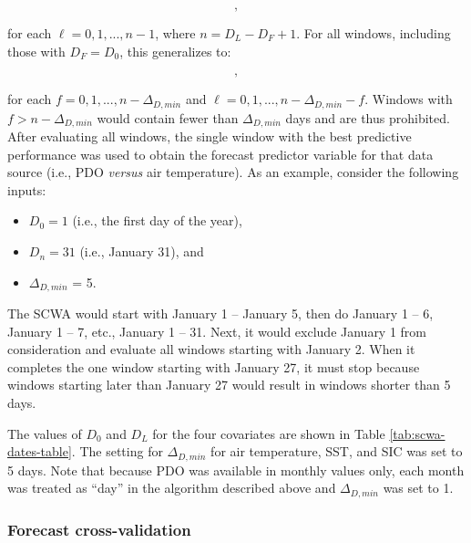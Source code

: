 \documentclass[12pt,]{book}
\providecommand{\tightlist}{%
  \setlength{\itemsep}{0pt}\setlength{\parskip}{0pt}}
\theoremstyle{definition}
\theoremstyle{definition}
\theoremstyle{definition}
\theoremstyle{remark}
\begin{document}
\begin{equation}
  [D_0, D_0 + \Delta_{D,min} - 1 + \ell],
\label{eq:scwa-1}
\end{equation}

\noindent
for each \(\ell = 0, 1, ..., n - 1\), where \(n = D_L - D_F + 1\). For
all windows, including those with \(D_F = D_0\), this generalizes to:

\begin{equation}
  [D_0 + f, D_0 + f + \Delta_{D,min} - 1 + \ell],
\label{eq:scwa-2}
\end{equation}

\noindent
for each \(f = 0, 1, ..., n - \Delta_{D,min}\) and
\(\ell = 0, 1, ..., n - \Delta_{D,min} - f\). Windows with
\(f > n - \Delta_{D,min}\) would contain fewer than \(\Delta_{D,min}\)
days and are thus prohibited. After evaluating all windows, the single
window with the best predictive performance was used to obtain the
forecast predictor variable for that data source (i.e., PDO
\emph{versus} air temperature). As an example, consider the following
inputs:

\begin{itemize}
\tightlist
\item
  \(D_0 = 1\) (i.e., the first day of the year),
\item
  \(D_n = 31\) (i.e., January 31), and
\item
  \(\Delta_{D,min}\) = 5.
\end{itemize}

The SCWA would start with January 1 -- January 5, then do January 1 --
6, January 1 -- 7, etc., January 1 -- 31. Next, it would exclude January
1 from consideration and evaluate all windows starting with January 2.
When it completes the one window starting with January 27, it must stop
because windows starting later than January 27 would result in windows
shorter than 5 days.

The values of \(D_0\) and \(D_L\) for the four covariates are shown in
Table \ref{tab:scwa-dates-table}. The setting for \(\Delta_{D,min}\) for
air temperature, SST, and SIC was set to 5 days. Note that because PDO
was available in monthly values only, each month was treated as ``day''
in the algorithm described above and \(\Delta_{D,min}\) was set to 1.

\subsubsection{Forecast cross-validation}\label{fcst-cv}
\end{document}
